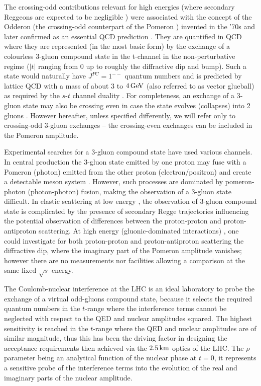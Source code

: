 The crossing-odd contributions relevant for high energies (where secondary Reggeons are expected to be negligible \cite{broniowski-2018}) were associated with the concept of the Odderon (the crossing-odd counterpart of the Pomeron \cite{levin-1998}) invented in the '70s \cite{nicolescu-1973,nicolescu-1975} and later confirmed as an essential QCD prediction \cite{bartels-1980,kwiecinski-1980,jaroszewicz-1981,braun,ioffe-2010}. They are quantified in QCD \cite{levin-1990,durham-2018} where they are represented (in the most basic form) by the exchange of a colourless 3-gluon compound state in the t-channel in the non-perturbative regime ($|t|$ ranging from 0 up to roughly the diffractive dip and bump). Such a state would naturally have $J^{PC}=1^{--}$ quantum numbers and is predicted by lattice QCD with a mass of about $3$ to $4\,{\rm GeV}$ (also referred to as vector glueball) as required by the $s$-$t$ channel duality \cite{veneziano-1968}. For completeness, an exchange of a 3-gluon state may also be crossing even in case the state evolves (collapses) into 2 gluons \cite{bartels-2000,bartels-2001,ewerz}. However hereafter, unless specified differently, we will refer only to crossing-odd 3-gluon exchanges -- the crossing-even exchanges can be included in the Pomeron amplitude.

Experimental searches for a 3-gluon compound state have used various channels. In central production the 3-gluon state emitted by one proton may fuse with a Pomeron (photon) emitted from the other proton (electron/positron) and create a detectable meson system \cite{hera-odderon-2002}. However, such processes are dominated by pomeron-photon (photon-photon) fusion, making the observation of a 3-gluon state difficult. In elastic scattering at low energy \cite{breakstone-85}, the observation of 3-gluon compound state is complicated by the presence of secondary Regge trajectories influencing the potential observation of differences between the proton-proton and proton-antiproton scattering. At high energy (gluonic-dominated interactions) \cite{yellow-report}, one could investigate for both proton-proton and proton-antiproton scattering the diffractive dip, where the imaginary part of the Pomeron amplitude vanishes; however there are no measurements nor facilities allowing a comparison at the same fixed $\sqrt s$ energy.

The Coulomb-nuclear interference at the LHC is an ideal laboratory to probe the exchange of a virtual odd-gluons compound state, because it selects the required quantum numbers in the $t$-range where the interference terms cannot be neglected with respect to the QED and nuclear amplitudes squared. The highest sensitivity is reached in the $t$-range where the QED and nuclear amplitudes are of similar magnitude, thus this has been the driving factor in designing the acceptance requirements then achieved via the $2.5\,{\rm km}$ optics of the LHC. The $\rho$ parameter being an analytical function of the nuclear phase at $t=0$, it represents a sensitive probe of the interference terms into the evolution of the real and imaginary parts of the nuclear amplitude.

